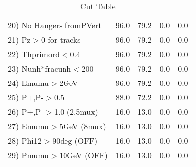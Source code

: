 \begin{table}[h!]
\begin{tabular}{||l||r|r|r|r||}
 20) No Hangers fromPVert &        96.0 &        79.2 &         0.0 &         0.0 \\
 21) Pz$>$0 for tracks    &        96.0 &        79.2 &         0.0 &         0.0 \\
 22) Thprimord$<$0.4      &        96.0 &        79.2 &         0.0 &         0.0 \\
 23) Nunh*fracunh$<$200   &        96.0 &        79.2 &         0.0 &         0.0 \\
 24) Emumu$>$2GeV         &        96.0 &        79.2 &         0.0 &         0.0 \\
 25) P+,P-$>$0.5          &        88.0 &        72.2 &         0.0 &         0.0 \\
 26) P+,P-$>$1.0 (2.5mux) &        16.0 &        13.0 &         0.0 &         0.0 \\
 27) Emumu$>$5GeV  (8mux) &        16.0 &        13.0 &         0.0 &         0.0 \\
 28) Phi12$>$90deg  (OFF) &        16.0 &        13.0 &         0.0 &         0.0 \\
 29) Pmumu$>$10GeV  (OFF) &        16.0 &        13.0 &         0.0 &         0.0 \\
 \hline
 \hline
 \end{tabular}
 \caption{Cut Table \cohjp  }
 \label{tab-cut__jpsi}
 \end{table}
